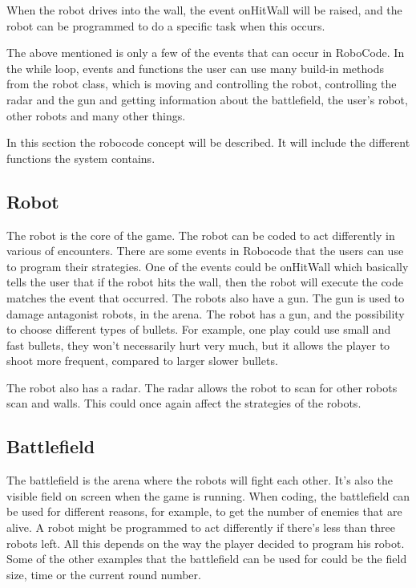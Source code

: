 When the robot drives into the wall, the event onHitWall will be raised, and the robot can be programmed to do a specific task when this occurs. 

The above mentioned is only a few of the events that can occur in RoboCode. In the while loop, events and functions the user can use many build-in methods from the robot class, which is moving and controlling the robot, controlling the radar and the gun and getting information about the battlefield, the user's robot, other robots and many other things. 


In this section the robocode concept will be described. It will include the different functions the system contains.
  
\subsection{Robot}
The robot is the core of the game. The robot can be coded to act differently in various of encounters. There are some events in Robocode that the users can use to program their strategies. One of the events could be onHitWall which basically tells the user that if the robot hits the wall, then the robot will execute the code matches the event that occurred. The robots also have a gun. The gun is used to damage antagonist robots, in the arena. The robot has a gun, and the possibility to choose different types of bullets. For example, one play could use small and fast bullets, they won’t necessarily hurt very much, but it allows the player to shoot more frequent, compared to larger slower bullets. 

The robot also has a radar. The radar allows the robot to scan for other robots scan and walls. This could once again affect the strategies of the robots.

\subsection{Battlefield}
The battlefield is the arena where the robots will fight each other. It’s also the visible field on screen when the game is running. When coding, the battlefield can be used for different reasons, for example, to get the number of enemies that are alive. A robot might be programmed to act differently if there’s less than three robots left. All this depends on the way the player decided to program his robot. Some of the other examples that the battlefield can be used for could be the field size, time or the current round number. 

